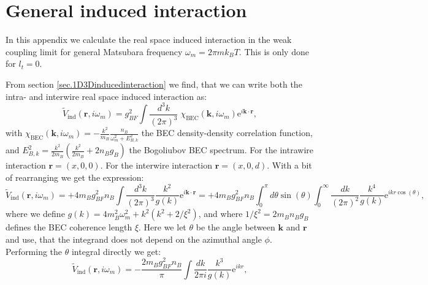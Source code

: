 
\chapter{General induced interaction} %

\label{Appendix.inducedinteraction.realspace} %


In this appendix we calculate the real space induced interaction in the weak coupling limit for general Matsubara frequency $\omega_m = 2\pi m k_B T$. This is only done for $l_t = 0$. 

From section \ref{sec.1D3Dinducedinteraction} we find, that we can write both the intra- and interwire real space induced interaction as:
\begin{equation}
\tilde{V}_{\text{ind}}(\mathbf{r}, i\omega_m) = g_{BF}^2\int\frac{d^3k}{(2\pi)^3}\; \chi_\text{BEC}(\mathbf{k}, i\omega_m)\text{e}^{i\mathbf{k}\cdot \mathbf{r}}, 
\label{eq.limitVindxomegam}
\end{equation}
with $\chi_\text{BEC}(\mathbf{k}, i\omega_m) = -\frac{k^2}{m_B}\frac{n_B}{\omega^2_m + E_{B,k}^2}$ the BEC density-density correlation function, and $E^2_{B,k} = \frac{k^2}{2m_B}\left(\frac{k^2}{2m_B} + 2n_Bg_B\right)$ the Bogoliubov BEC spectrum. For the intrawire interaction $\mathbf{r} = (x, 0, 0)$. For the interwire interaction $\mathbf{r} = (x, 0, d)$. With a bit of rearranging we get the expression:
\begin{equation}
\tilde{V}_{\text{ind}}(\mathbf{r}, i\omega_m) = +4m_Bg^2_{BF}n_B\int \frac{d^3k}{(2\pi)^3} \frac{k^2}{g(k)}\text{e}^{i\mathbf{k}\cdot\mathbf{r}} = +4m_Bg^2_{BF}n_B\int_0^\pi d\theta \sin(\theta)\int_0^{\infty} \frac{dk}{(2\pi)^2} \frac{k^4}{g(k)}\text{e}^{ikr\cos(\theta)}, \nonumber
\end{equation}
where we define $g(k) = 4m_B^2\omega^2_m + k^2(k^2 + 2/\xi^2)$, and where $1/\xi^2 = 2m_Bn_Bg_B$ defines the BEC coherence length $\xi$. Here we let $\theta$ be the angle between $\mathbf{k}$ and $\mathbf{r}$ and use, that the integrand does not depend on the azimuthal angle $\phi$. Performing the $\theta$ integral directly we get:
\begin{equation}
\tilde{V}_{\text{ind}}(\mathbf{r}, i\omega_m) = -\frac{2m_Bg^2_{BF}n_B}{\pi}\int \frac{dk}{2\pi i} \frac{k^3}{g(k)}\text{e}^{ikr}, \nonumber
\end{equation}
